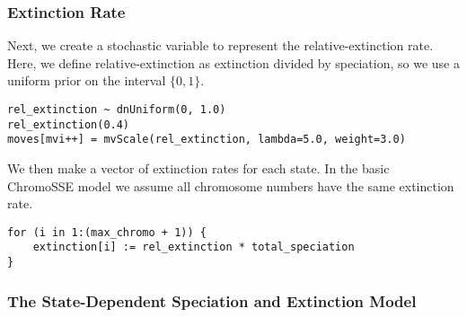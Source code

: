 \subsubsection{Extinction Rate}

Next, we create a stochastic variable to represent the relative-extinction rate.
Here, we define relative-extinction as extinction divided by speciation,
so we use a uniform prior on the interval $\{0,1\}$.
{\tt \begin{snugshade*}
\begin{lstlisting}
rel_extinction ~ dnUniform(0, 1.0)
rel_extinction(0.4)
moves[mvi++] = mvScale(rel_extinction, lambda=5.0, weight=3.0)
\end{lstlisting}
\end{snugshade*}
}
We then make a vector of extinction rates for each state.
In the basic ChromoSSE model we assume all chromosome 
numbers have the same extinction rate.
{\tt \begin{snugshade*}
\begin{lstlisting}
for (i in 1:(max_chromo + 1)) {
    extinction[i] := rel_extinction * total_speciation
}
\end{lstlisting}
\end{snugshade*}
}

\subsubsection{The State-Dependent Speciation and Extinction Model}

